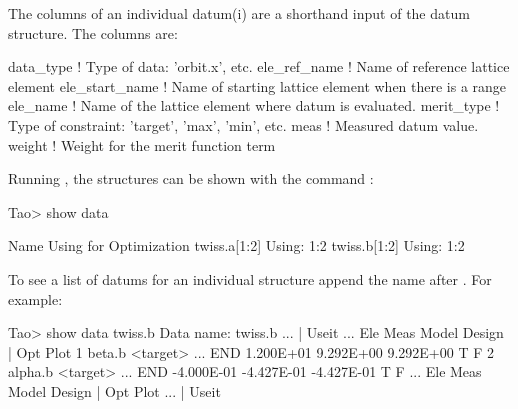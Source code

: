 \documentclass{hitec}
\begin{document}
The columns of an individual datum(i) are a shorthand input of the datum structure.  The columns
are:
\begin{code}
data_type       ! Type of data: 'orbit.x', etc.
ele_ref_name    ! Name of reference lattice element
ele_start_name  ! Name of starting lattice element when there is a range
ele_name        ! Name of the lattice element where datum is evaluated.
merit_type      ! Type of constraint: 'target', 'max', 'min', etc.
meas            ! Measured datum value.
weight          ! Weight for the merit function term
\end{code}

Running \tao, the  structures can be shown with the command : 
\begin{code}
Tao> show data

  Name                                 Using for Optimization
  twiss.a[1:2]                                   Using: 1:2
  twiss.b[1:2]                                   Using: 1:2
\end{code}

To see a list of datums for an individual  structure append the  name after .
For example:
\begin{code}
Tao> show data twiss.b
Data name: twiss.b
                    ...                                           |   Useit
                    ...  Ele         Meas       Model      Design | Opt  Plot
1  beta.b <target>  ...  END    1.200E+01   9.292E+00   9.292E+00     T     F
2  alpha.b <target> ...  END   -4.000E-01  -4.427E-01  -4.427E-01     T     F
                    ...  Ele         Meas       Model      Design | Opt  Plot
                    ...                                           |   Useit
\end{code}
\end{document}
